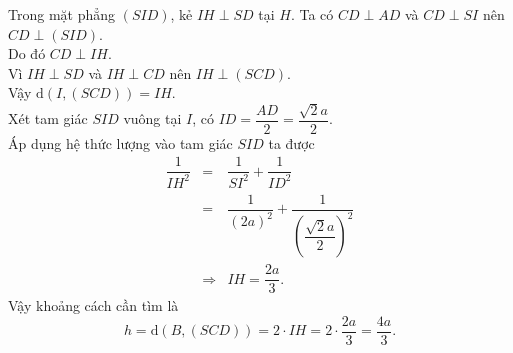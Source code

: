 \begin{ex}
{		Trong  mặt phẳng $(SID)$, kẻ $IH \perp SD$ tại $H$. Ta có $CD \perp AD$ và $CD \perp SI$ nên $CD \perp (SID)$.\\
		Do đó $CD  \perp IH$.\\
		Vì $IH \perp SD$ và $IH \perp  CD$ nên $IH \perp (SCD)$.\\
		Vậy $\mathrm{d}\left(I, (SCD)\right) = IH$.\\ 
		Xét tam giác  $SID$ vuông tại $I$, có $ID = \dfrac{AD}{2} = \dfrac{\sqrt{2}a}{2}$.\\
		Áp dụng hệ thức lượng vào  tam giác $SID$ ta được
		\allowdisplaybreaks 
		\begin{eqnarray*}
			\dfrac{1}{IH^2}  &=& \dfrac{1}{SI^2} + \dfrac{1}{ID^2}\\
			&=& \dfrac{1}{(2a)^2}  + \dfrac{1}{\left(\dfrac{\sqrt{2}a}{2}\right)^2} \\
			&\Rightarrow& IH = \dfrac{2a}{3}. 
		\end{eqnarray*}
		Vậy  khoảng cách cần tìm là
		$$h = \mathrm{d}\left(B, (SCD)\right) = 2 \cdot IH = 2 \cdot \dfrac{2a}{3}  = \dfrac{4a}{3}.$$
	} 
\end{ex}

